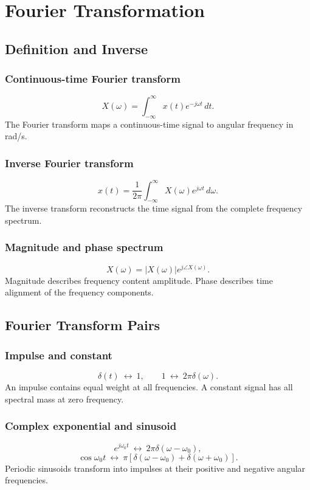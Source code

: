 \section{Fourier Transformation}

\subsection{Definition and Inverse}

\subsubsection{Continuous-time Fourier transform}
\[
X(\omega)=\int_{-\infty}^{\infty}x(t)e^{-j\omega t}\,dt.
\]
The Fourier transform maps a continuous-time signal to angular frequency in rad/s.

\subsubsection{Inverse Fourier transform}
\[
x(t)=\frac{1}{2\pi}\int_{-\infty}^{\infty}X(\omega)e^{j\omega t}\,d\omega.
\]
The inverse transform reconstructs the time signal from the complete frequency spectrum.

\subsubsection{Magnitude and phase spectrum}
\[
X(\omega)=|X(\omega)|e^{j\angle X(\omega)}.
\]
Magnitude describes frequency content amplitude. Phase describes time alignment of the frequency components.

\subsection{Fourier Transform Pairs}

\subsubsection{Impulse and constant}
\[
\delta(t)\ \longleftrightarrow\ 1,
\qquad
1\ \longleftrightarrow\ 2\pi\delta(\omega).
\]
An impulse contains equal weight at all frequencies. A constant signal has all spectral mass at zero frequency.

\subsubsection{Complex exponential and sinusoid}
\[
e^{j\omega_0t}\ \longleftrightarrow\ 2\pi\delta(\omega-\omega_0),
\]
\[
\cos\omega_0t\ \longleftrightarrow\ \pi[\delta(\omega-\omega_0)+\delta(\omega+\omega_0)].
\]
Periodic sinusoids transform into impulses at their positive and negative angular frequencies.

